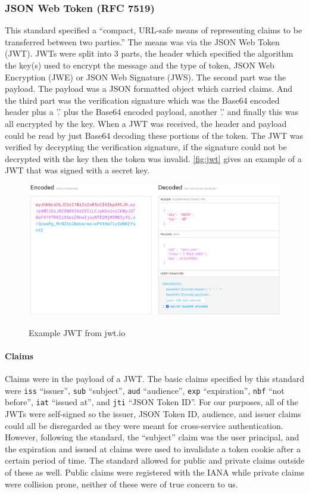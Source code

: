 \subsubsection{JSON Web Token (RFC 7519)}
This standard specified a ``compact, URL-safe means of representing claims to be transferred between two parties.'' The means was via the JSON Web Token (JWT). JWTs were split into 3 parts, the header which specified the algorithm the key(s) used to encrypt the message and the type of token, JSON Web Encryption (JWE) or JSON Web Signature (JWS). The second part was the payload. The payload was a JSON formatted object which carried claims. And the third part was the verification signature which was the Base64 encoded header plus a '.' plus the Base64 encoded payload, another '.' and finally this was all encrypted by the key. When a JWT was received, the header and payload could be read by just Base64 decoding these portions of the token. The JWT was verified by decrypting the verification signature, if the signature could not be decrypted with the key then the token was invalid. \autoref{fig:jwt} gives an example of a JWT that was signed with a secret key.
\begin{figure}[H]
\centering
\caption{Example JWT from jwt.io}
\includegraphics[width=\textwidth]{images/jwt.png}
\label{fig:jwt}
\end{figure}

\paragraph{Claims}
Claims were in the payload of a JWT. The basic claims specified by this standard were \verb|iss| ``issuer'', \verb|sub| ``subject'', \verb|aud| ``audience'', \verb|exp| ``expiration'', \verb|nbf| ``not before'', \verb|iat| ``issued at'', and \verb|jti| ``JSON Token ID''. For our purposes, all of the JWTs were self-signed so the issuer, JSON Token ID, audience, and issuer claims could all be disregarded as they were meant for cross-service authentication. However, following the standard, the ``subject'' claim was the user principal, and the expiration and issued at claims were used to invalidate a token cookie after a certain period of time. The standard allowed for public and private claims outside of these as well. Public claims were registered with the IANA while private claims were collision prone, neither of these were of true concern to us.
